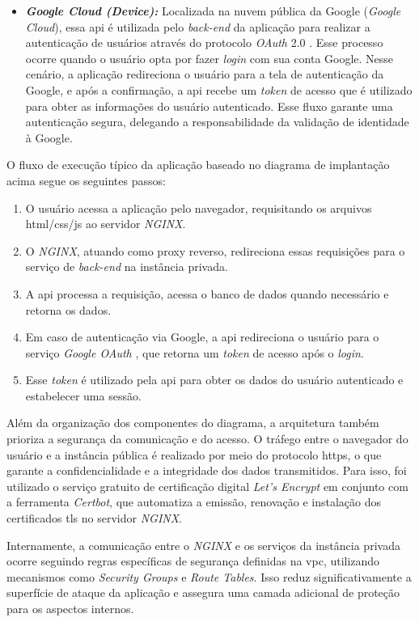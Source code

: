 \begin{itemize}
  \item \textbf{\textit{Google Cloud (Device):}} Localizada na nuvem pública da Google (\textit{Google Cloud}), essa \gls{api} é utilizada pelo \emph{back-end} da aplicação para realizar a autenticação de usuários através do protocolo \emph{OAuth} 2.0 \cite{GoogleOAuth}. Esse processo ocorre quando o usuário opta por fazer \emph{login} com sua conta Google. Nesse cenário, a aplicação redireciona o usuário para a tela de autenticação da Google, e após a confirmação, a \gls{api} recebe um \textit{token} de acesso que é utilizado para obter as informações do usuário autenticado. Esse fluxo garante uma autenticação segura, delegando a responsabilidade da validação de identidade à Google.
\end{itemize}

O fluxo de execução típico da aplicação baseado no diagrama de implantação acima segue os seguintes passos:
\begin{enumerate}
  \item O usuário acessa a aplicação pelo navegador, requisitando os arquivos \gls{html}\slash\gls{css}\slash\gls{js} ao servidor \emph{NGINX}.
  \item O \emph{NGINX}, atuando como proxy reverso, redireciona essas requisições para o serviço de \emph{back-end} na instância privada.
  \item A \gls{api} processa a requisição, acessa o banco de dados quando necessário e retorna os dados.
  \item Em caso de autenticação via Google, a \gls{api} redireciona o usuário para o serviço \emph{Google OAuth} \cite{GoogleOAuth}, que retorna um \emph{token} de acesso após o \emph{login}.
  \item Esse \emph{token} é utilizado pela \gls{api} para obter os dados do usuário autenticado e estabelecer uma sessão.
\end{enumerate}

Além da organização dos componentes do diagrama, a arquitetura também prioriza a segurança da comunicação e do acesso. O tráfego entre o navegador do usuário e a instância pública é realizado por meio do protocolo \gls{https}, o que garante a confidencialidade e a integridade dos dados transmitidos. Para isso, foi utilizado o serviço gratuito de certificação digital \emph{Let's Encrypt} em conjunto com a ferramenta \emph{Certbot}, que automatiza a emissão, renovação e instalação dos certificados \gls{tls} no servidor \emph{NGINX}.

Internamente, a comunicação entre o \emph{NGINX} e os serviços da instância privada ocorre seguindo regras específicas de segurança definidas na \gls{vpc}, utilizando mecanismos como \textit{Security Groups} e \textit{Route Tables}. Isso reduz significativamente a superfície de ataque da aplicação e assegura uma camada adicional de proteção para os aspectos internos.

